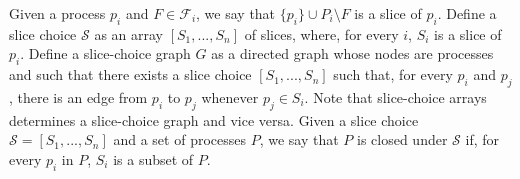 \documentclass[11pt]{article}
\begin{document}
Given a process $p_i$ and $F\in \mathcal{F}_i$, we say that $\{p_i\}\cup P_i\setminus F$ is a slice of $p_i$.
Define a slice choice $\mathcal{S}$ as an array $\left[S_1,...,S_n\right]$ of slices, where, for every $i$, $S_i$ is a slice of $p_i$.
Define a slice-choice graph $G$ as a directed graph whose nodes are processes and such that there exists a slice choice $\left[S_1,...,S_n\right]$ such that, for every $p_i$ and $p_j$, there is an edge from $p_i$ to $p_j$ whenever $p_j\in S_i$. Note that slice-choice arrays determines a slice-choice graph and vice versa.
Given a slice choice $\mathcal{S}=\left[S_1,...,S_n\right]$ and a set of processes $P$, we say that $P$ is closed under $\mathcal{S}$ if, for every $p_i$ in $P$, $S_i$ is a subset of $P$.





\end{document}
